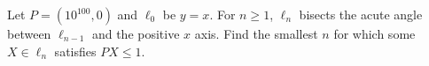 Let $P=(10^{100},0)$ and $\ell_0$ be $y=x$. For $n\ge1$, $\ell_n$ bisects the acute angle between $\ell_{n-1}$ and the positive $x$ axis. Find the smallest $n$ for which some $X\in\ell_n$ satisfies $PX\le1$.
